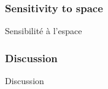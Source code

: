 \subsubsection{Sensitivity to space}{Sensibilité à l'espace}












\subsubsection{Discussion}{Discussion}




















